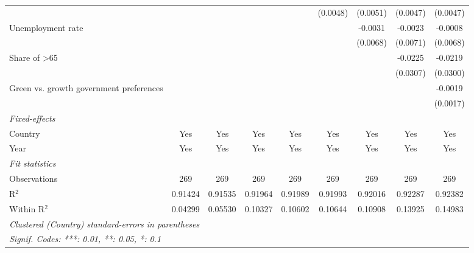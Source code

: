 \begin{table}[htbp]
\begin{tabular}{lcccccccc}
                                               &               &               &              &              & (0.0048)     & (0.0051)     & (0.0047)               & (0.0047)\\   
      Unemployment rate                        &               &               &              &              &              & -0.0031      & -0.0023                & -0.0008\\   
                                               &               &               &              &              &              & (0.0068)     & (0.0071)               & (0.0068)\\   
      Share of >65                             &               &               &              &              &              &              & -0.0225                & -0.0219\\   
                                               &               &               &              &              &              &              & (0.0307)               & (0.0300)\\   
      Green vs. growth government preferences  &               &               &              &              &              &              &                        & -0.0019\\   
                                               &               &               &              &              &              &              &                        & (0.0017)\\   
      \midrule
      \emph{Fixed-effects}\\
      Country                                  & Yes           & Yes           & Yes          & Yes          & Yes          & Yes          & Yes                    & Yes\\  
      Year                                     & Yes           & Yes           & Yes          & Yes          & Yes          & Yes          & Yes                    & Yes\\  
      \midrule
      \emph{Fit statistics}\\
      Observations                             & 269           & 269           & 269          & 269          & 269          & 269          & 269                    & 269\\  
      R$^2$                                    & 0.91424       & 0.91535       & 0.91964      & 0.91989      & 0.91993      & 0.92016      & 0.92287                & 0.92382\\  
      Within R$^2$                             & 0.04299       & 0.05530       & 0.10327      & 0.10602      & 0.10644      & 0.10908      & 0.13925                & 0.14983\\  
      \midrule \midrule
      \multicolumn{9}{l}{\emph{Clustered (Country) standard-errors in parentheses}}\\
      \multicolumn{9}{l}{\emph{Signif. Codes: ***: 0.01, **: 0.05, *: 0.1}}\\
   \end{tabular}
\end{table}


